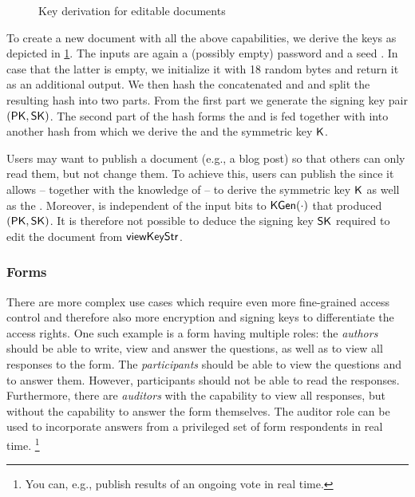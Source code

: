 \begin{figure}[t!]
  \centering
  
  \caption{Key derivation for editable documents}
  \label{fig:encryptor2}
\end{figure}

To create a new document with all the above capabilities, we derive the keys as depicted in \cref{fig:encryptor2}.
The inputs are again a (possibly empty) password \mypwd and a seed \myEditKeyStr.
In case that the latter is empty, we initialize it with 18 random bytes and return it as an additional output.
We then hash the concatenated \mypwd and \myEditKeyStr and split the resulting hash into two parts.
From the first part we generate the signing key pair $\myKeyPair{}$.
The second part of the hash forms the \myViewKeyStr and is fed together with \mypwd into another hash from which we derive the \mychanID and the symmetric key $\mySymKey$.

Users may want to publish a document (e.g., a blog post) so that others can only read them, but not change them.
To achieve this, users can publish the \myViewKeyStr since it allows -- together with the knowledge of \mypwd -- to derive the symmetric key $\mySymKey$ as well as the \mychanID.
Moreover, \myViewKeyStr is independent of the input bits to $\myKGen{\cdot}$ that produced $\myKeyPair{}$.
It is therefore not possible to deduce the signing key $\mySK$ required to edit the document from $\myViewKeyStr$.

\subsubsection{Forms}
\label{sec:forms}

There are more complex use cases which require even more fine-grained access control and therefore also more encryption and signing keys to differentiate the access rights.
One such example is a form having multiple roles:
the \textit{authors} should be able to write, view and answer the questions, as well as to view all responses to the form.
The \textit{participants} should be able to view the questions and to answer them. However, participants should not be able to read the responses.
Furthermore, there are \textit{auditors} with the capability to view all responses, but without the capability to answer the form themselves.
The auditor role can be used to incorporate answers from a privileged set of form respondents in real time.%
\footnote{You can, e.g., publish results of an ongoing vote in real time.}

